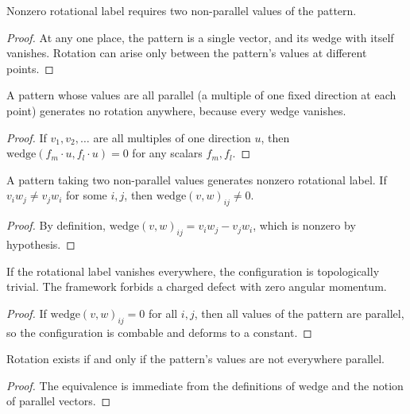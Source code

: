 \begin{theorem}
Nonzero rotational label requires two non-parallel values of the pattern.
\end{theorem}
\begin{proof}
At any one place, the pattern is a single vector, and its wedge with itself vanishes. Rotation can arise
only between the pattern's values at different points.
\end{proof}

\begin{theorem}
A pattern whose values are all parallel (a multiple of one fixed direction at each point) generates
no rotation anywhere, because every wedge vanishes.
\end{theorem}
\begin{proof}
If $v_1, v_2, \ldots$ are all multiples of one direction $u$, then $\text{wedge}(f_m \cdot u, f_l \cdot u) = 0$ for any scalars $f_m, f_l$.
\end{proof}

\begin{theorem}
A pattern taking two non-parallel values generates nonzero rotational label. If $v_i w_j \neq v_j w_i$
for some $i, j$, then $\text{wedge}(v, w)_{ij} \neq 0$.
\end{theorem}
\begin{proof}
By definition, $\text{wedge}(v, w)_{ij} = v_i w_j - v_j w_i$, which is nonzero by hypothesis.
\end{proof}

\begin{theorem}
If the rotational label vanishes everywhere, the configuration is topologically trivial.
The framework forbids a charged defect with zero angular momentum.
\end{theorem}
\begin{proof}
If $\text{wedge}(v, w)_{ij} = 0$ for all $i, j$, then all values of the pattern are parallel, so the configuration
is combable and deforms to a constant.
\end{proof}

\begin{theorem}
Rotation exists if and only if the pattern's values are not everywhere parallel.
\end{theorem}
\begin{proof}
The equivalence is immediate from the definitions of $\text{wedge}$ and the notion of parallel vectors.
\end{proof}

